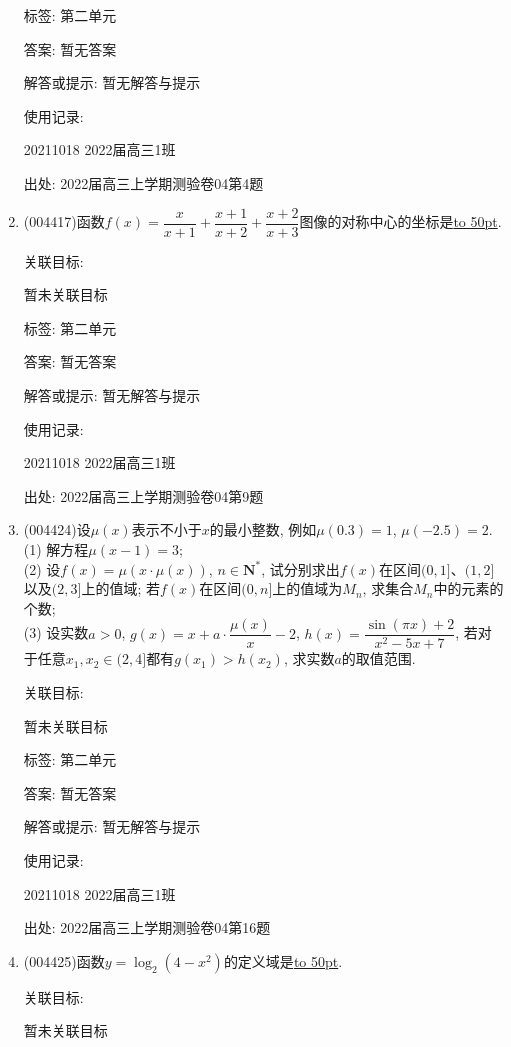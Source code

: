 \documentclass[10pt,a4paper]{article}
\newcommand{\blank}[1]{\underline{\hbox to #1pt{}}}
\begin{document}
\begin{enumerate}[1.]
标签: 第二单元

答案: 暂无答案

解答或提示: 暂无解答与提示

使用记录:

20211018	2022届高三1班	


出处: 2022届高三上学期测验卷04第4题
\item { (004417)}函数$f(x)=\dfrac x{x+1}+\dfrac{x+1}{x+2}+\dfrac{x+2}{x+3}$图像的对称中心的坐标是\blank{50}.


关联目标:

暂未关联目标



标签: 第二单元

答案: 暂无答案

解答或提示: 暂无解答与提示

使用记录:

20211018	2022届高三1班	


出处: 2022届高三上学期测验卷04第9题
\item { (004424)}设$\mu (x)$表示不小于$x$的最小整数, 例如$\mu(0.3)=1$, $\mu(-2.5)=2$.\\
(1) 解方程$\mu(x-1)=3$;\\
(2) 设$f(x)=\mu (x\cdot \mu (x))$, $n\in \mathbf{N}^*$, 试分别求出$f(x)$在区间$(0,1]$、$(1,2]$以及$(2,3]$上的值域; 若$f(x)$在区间$(0,n]$上的值域为$M_n$, 求集合$M_n$中的元素的个数;\\
(3) 设实数$a>0$, $g(x)=x+a\cdot \dfrac{\mu (x)}x-2$, $h(x)=\dfrac{\sin (\pi x)+2}{x^2-5x+7}$, 若对于任意$x_1,x_2\in (2,4]$都有$g(x_1)>h(x_2)$, 求实数$a$的取值范围.


关联目标:

暂未关联目标



标签: 第二单元

答案: 暂无答案

解答或提示: 暂无解答与提示

使用记录:

20211018	2022届高三1班			


出处: 2022届高三上学期测验卷04第16题
\item { (004425)}函数$y=\log_2(4-x^2)$的定义域是\blank{50}.


关联目标:

暂未关联目标




\end{enumerate}
\end{document}
